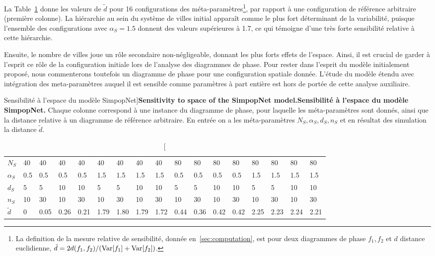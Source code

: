 La Table~\ref{tab:macrocoevolexplo:spacematters} donne les valeurs de $\tilde{d}$ pour 16 configurations des méta-paramètres\footnote{La definition de la mesure relative de sensibilité, donnée en~\ref{sec:computation}, est pour deux diagrammes de phase $f_1,f_2$ et $d$ distance euclidienne, $\tilde{d} = 2 d(f_1,f_2)/(\operatorname{Var}\!\left[f_1\right]+\operatorname{Var}\!\left[f_2\right])$.}, par rapport à une configuration de référence arbitraire (première colonne). La hiérarchie au sein du système de villes initial apparaît comme le plus fort déterminant de la variabilité, puisque l'ensemble des configurations avec $\alpha_S = 1.5$ donnent des valeurs supérieures à 1.7, ce qui témoigne d'une très forte sensibilité relative à cette hiérarchie.

Ensuite, le nombre de villes joue un rôle secondaire non-négligeable, donnant les plus forts effets de l'espace. Ainsi, il est crucial de garder à l'esprit ce rôle de la configuration initiale lors de l'analyse des diagrammes de phase. Pour rester dans l'esprit du modèle initialement proposé, nous commenterons toutefois un diagramme de phase pour une configuration spatiale donnée. L'étude du modèle étendu avec intégration des meta-paramètres auquel il est sensible comme paramètres à part entière est hors de portée de cette analyse auxiliaire.



\begin{table}[!ht]
\caption[Sensitivity to space of the SimpopNet model][Sensibilité à l'espace du modèle SimpopNet]{\textbf{Sensitivity to space of the SimpopNet model.}\label{tab:macrocoevolexplo:spacematters}}{\textbf{Sensibilité à l'espace du modèle SimpopNet.} Chaque colonne correspond à une instance du diagramme de phase, pour laquelle les méta-paramètres sont donnés, ainsi que la distance relative à un diagramme de référence arbitraire. En entrée on a les méta-paramètres $N_S,\alpha_S,d_S,n_S$ et en résultat des simulation la distance $\tilde{d}$.\label{tab:macrocoevolexplo:spacematters}}
\begin{tabular}{|l|l|l|l|l|l|l|l|l|l|l|l|l|l|l|l|l|}
\hline
$N_S$ & 40 & 40 & 40 & 40 & 40 & 40 & 40 & 40 & 80 & 80 & 80 & 80 & 80 & 80 & 80 & 80\\
$\alpha_S$ & 0.5 & 0.5 & 0.5 & 0.5 & 1.5 & 1.5 & 1.5 & 1.5 & 0.5 & 0.5 & 0.5 & 0.5 & 1.5 & 1.5 & 1.5 & 1.5\\
$d_S$ & 5 & 5 & 10 & 10 & 5 & 5 & 10 & 10 & 5 & 5 & 10 & 10 & 5 & 5 & 10 & 10\\
$n_S$ & 10 & 30 & 10 & 30 & 10 & 30 & 10 & 30 & 10 & 30 & 10 & 30 & 10 & 30 & 10 & 30\\\hline
$\tilde{d}$ & 0 & 0.05 & 0.26 & 0.21 & 1.79 & 1.80 & 1.79 & 1.72 & 0.44 & 0.36 & 0.42 & 0.42 & 2.25 & 2.23 & 2.24 & 2.21\\\hline
\end{tabular}
\end{table}



